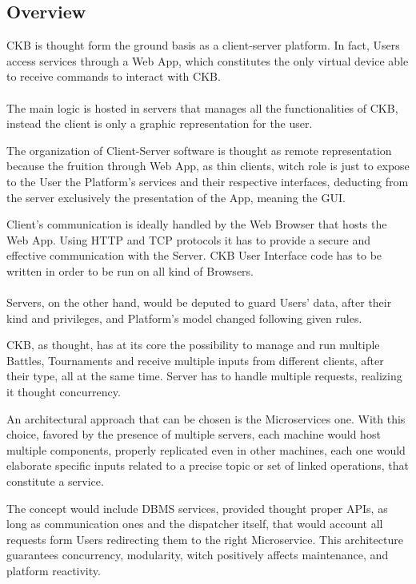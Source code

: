 \subsection{Overview}


CKB is thought form the ground basis as a client-server platform. In fact, Users access services through a Web App, which constitutes the only virtual device able to receive commands to interact 
with CKB.\\\\
The main logic is hosted in servers that manages all the functionalities of CKB, instead the client is only a graphic representation for the user.

The organization of Client-Server software is thought as remote representation because the fruition through Web App, as thin clients, witch role is just to expose to the User the Platform's 
services and their respective interfaces, deducting from the server exclusively the presentation of the App, meaning the GUI.

Client's communication is ideally handled by the Web Browser that hosts the Web App. Using HTTP and TCP protocols it has to provide a secure and effective communication with the Server. 
CKB User Interface code has to be written in order to be run on all kind of Browsers.\\\\
Servers, on the other hand, would be deputed to guard Users' data, after their kind and privileges, and Platform's model changed following given rules.

CKB, as thought, has at its core the possibility to manage and run multiple Battles, Tournaments and receive multiple inputs from different clients, after their type, all at the same time. 
Server has to handle multiple requests, realizing it thought concurrency.

An architectural approach that can be chosen is the Microservices one. 
With this choice, favored by the presence of multiple servers, each machine would host multiple components, properly replicated even in other machines, each one would elaborate specific inputs 
related to a precise topic or set of linked operations, that constitute a service.

The concept would include DBMS services, provided thought proper APIs, as long as communication ones and the dispatcher itself, that would account all requests form Users redirecting them to the 
right Microservice. This architecture guarantees concurrency, modularity, witch positively affects maintenance, and platform reactivity.

